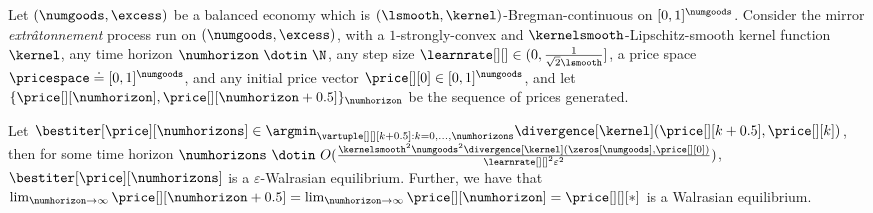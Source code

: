 \begin{corollary}\label{thm:bregman_mirror_exta_tatonn_convergence}
    Let $(\numgoods, \excess)$ be a balanced economy which is $(\lsmooth, \kernel)$-Bregman-continuous on $[0, 1]^\numgoods$. 
    Consider the mirror \emph{extr\^atonnement} process run on $(\numgoods, \excess)$, with a $1$-strongly-convex and $\kernelsmooth$-Lipschitz-smooth kernel function $\kernel$, any time horizon $\numhorizon \ \dotin \  \N$, any step size $\learnrate[ ][ ] \in (0, \frac{1}{\sqrt{2}\lsmooth}]$, a price space $\pricespace \doteq [0, 1]^\numgoods$, and any initial price vector $\price[][0] \in [0, 1]^\numgoods$, and let $\{\price[][\numhorizon], \price[][\numhorizon + 0.5] \}_{\numhorizon}$ be the sequence of prices generated. 

    Let $\bestiter[{\price}][\numhorizons] \in \argmin_{\vartuple[][][k+0.5] : k = 0, \hdots, \numhorizons} \divergence[\kernel](\price[][k+0.5], \price[][k])$, then for some  time horizon $\numhorizons \ \dotin \ O(\frac{\kernelsmooth^2 \numgoods^2 \divergence[\kernel](\zeros[\numgoods], \price[][0])}{\learnrate[ ][ ]^2 \varepsilon^2})$, 
    $\bestiter[{\price}][\numhorizons]$ is a $\varepsilon$-Walrasian equilibrium.
    Further, we have that $\lim_{\numhorizon \to \infty} \price[][\numhorizon+0.5] = \lim_{\numhorizon \to \infty} \price[][\numhorizon] = \price[][][*]$ is a Walrasian equilibrium.
\end{corollary}




